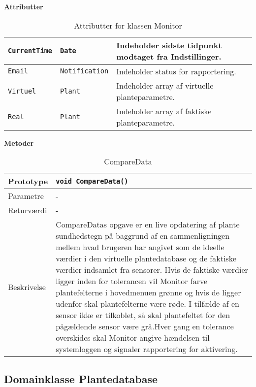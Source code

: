 \textbf{Attributter}

\begin{table}[h]
\begin{tabularx}{\textwidth}{| >{\raggedright\arraybackslash}X | >{\raggedright\arraybackslash}X | >{\raggedright\arraybackslash}p{10 cm} |} \hline
\texttt{CurrentTime} & \texttt{Date} & Indeholder sidste tidpunkt modtaget fra Indstillinger. \\\hline
\texttt{Email} & \texttt{Notification} & Indeholder status for rapportering. \\\hline
\texttt{Virtuel} & \texttt{Plant} & Indeholder array af virtuelle planteparametre. \\\hline
\texttt{Real} & \texttt{Plant} & Indeholder array af faktiske planteparametre. \\\hline
\end{tabularx}
\caption{Attributter for klassen Monitor}
\label{table:Monitor_attributter}
\end{table}

\textbf{Metoder}

\begin{table}[h]
\begin{tabularx}{\textwidth}{| >{\raggedright\arraybackslash}p{2.5 cm} | >{\raggedright\arraybackslash}X |} \hline
Prototype & \texttt{void CompareData()} \\\hline
Parametre & - \\\hline
Returværdi & - \\\hline
Beskrivelse & CompareDatas opgave er en live opdatering af plante sundhedstegn på baggrund af en sammenligningen mellem hvad brugeren har angivet som de ideelle værdier i den virtuelle plantedatabase og de faktiske værdier indsamlet fra sensorer. Hvis de faktiske værdier ligger inden for tolerancen vil Monitor farve plantefelterne i hovedmenuen grønne og hvis de ligger udenfor skal plantefelterne være røde. I tilfælde af en sensor ikke er tilkoblet, så skal plantefeltet for den pågældende sensor være grå.Hver gang en tolerance overskides skal Monitor angive hændelsen til systemloggen og signaler rapportering for aktivering. \\\hline
\end{tabularx}
\caption{CompareData}
\label{table:CompareData}
\end{table}

\clearpage

\subsection{Domainklasse Plantedatabase}

